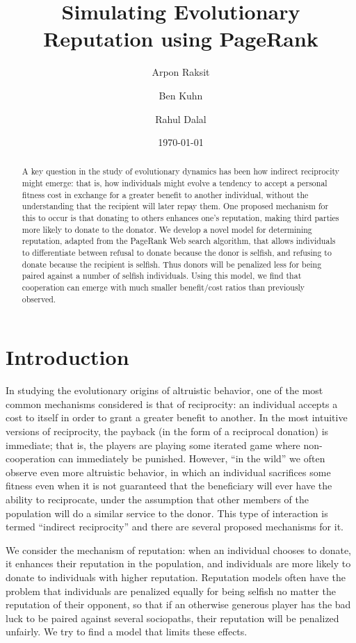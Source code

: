 \documentclass{amsart}
\title{Simulating Evolutionary Reputation using PageRank}
\author{Arpon Raksit \and Ben Kuhn \and Rahul Dalal}
\date{\today}
\begin{document}
\begin{abstract}
A key question in the study of evolutionary dynamics has been how
indirect reciprocity might emerge: that is, how individuals might
evolve a tendency to accept a personal fitness cost in exchange for a
greater benefit to another individual, without the understanding that
the recipient will later repay them. One proposed mechanism for this
to occur is that donating to others enhances one's reputation, making
third parties more likely to donate to the donator. We develop a novel
model for determining reputation, adapted from the PageRank Web search
algorithm, that allows individuals to differentiate between refusal to
donate because the donor is selfish, and refusing to donate because
the recipient is selfish. Thus donors will be penalized less for being
paired against a number of selfish individuals. Using this model, we
find that cooperation can emerge with much smaller benefit/cost ratios
than previously observed.
\end{abstract}

\maketitle

\section{Introduction}

In studying the evolutionary origins of altruistic behavior, one of the most common mechanisms considered is that of reciprocity: an individual accepts a cost to itself in order to grant a greater benefit to another. In the most intuitive versions of reciprocity, the payback (in the form of a reciprocal donation) is immediate; that is, the players are playing some iterated game where non-cooperation can immediately be punished. However, ``in the wild'' we often observe even more altruistic behavior, in which an individual sacrifices some fitness even when it is not guaranteed that the beneficiary will ever have the ability to reciprocate, under the assumption that other members of the population will do a similar service to the donor. This type of interaction is termed ``indirect reciprocity'' and there are several proposed mechanisms for it.

We consider the mechanism of reputation: when an individual chooses to donate, it enhances their reputation in the population, and individuals are more likely to donate to individuals with higher reputation. Reputation models often have the problem that individuals are penalized equally for being selfish no matter the reputation of their opponent, so that if an otherwise generous player has the bad luck to be paired against several sociopaths, their reputation will be penalized unfairly. We try to find a model that limits these effects.
\end{document}

